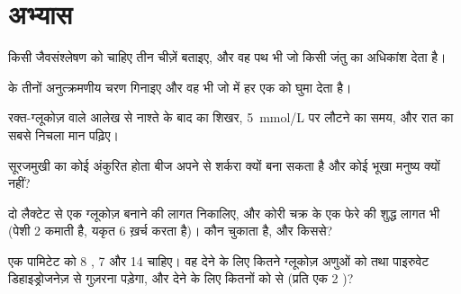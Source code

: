 \section{अभ्यास}

\begin{exercise}[$\star$]\label{exo:b1:biosyntheses-integration:1}
किसी जैवसंश्लेषण को चाहिए तीन चीज़ें बताइए, और वह पथ भी जो किसी जंतु
 का अधिकांश  देता है।
\end{exercise}

\begin{exercise}[$\star$]\label{exo:b1:biosyntheses-integration:2}
 के तीनों अनुत्क्रमणीय चरण गिनाइए और वह  भी जो
 में हर एक को घुमा देता है।
\end{exercise}

\begin{exercise}[$\star$]\label{exo:b1:biosyntheses-integration:3}
रक्त-ग्लूकोज़ वाले आलेख से नाश्ते के बाद का शिखर, \qty{5}{mmol/L} पर
लौटने का समय, और रात का सबसे निचला मान पढ़िए।
\end{exercise}

\begin{exercise}[$\star$]\label{exo:b1:biosyntheses-integration:4}
सूरजमुखी का कोई अंकुरित होता बीज अपने  से शर्करा क्यों बना सकता है और
कोई भूखा मनुष्य क्यों नहीं?
\end{exercise}

\begin{exercise}[$\star\star$]\label{exo:b1:biosyntheses-integration:5}
दो लैक्टेट से एक ग्लूकोज़ बनाने की  लागत निकालिए, और कोरी चक्र के एक
फेरे की शुद्ध लागत भी (पेशी 2 कमाती है, यकृत 6 ख़र्च करता है)।
कौन चुकाता है, और किससे?
\end{exercise}

\begin{exercise}[$\star\star$]\label{exo:b1:biosyntheses-integration:6}
एक पामिटेट को 8 , 7  और 14  चाहिए। वह  देने
के लिए कितने ग्लूकोज़ अणुओं को  तथा पाइरुवेट डिहाइड्रोजनेज़
से गुज़रना पड़ेगा, और  देने के लिए कितनों को  से
(प्रति एक 2 )?
\end{exercise}

